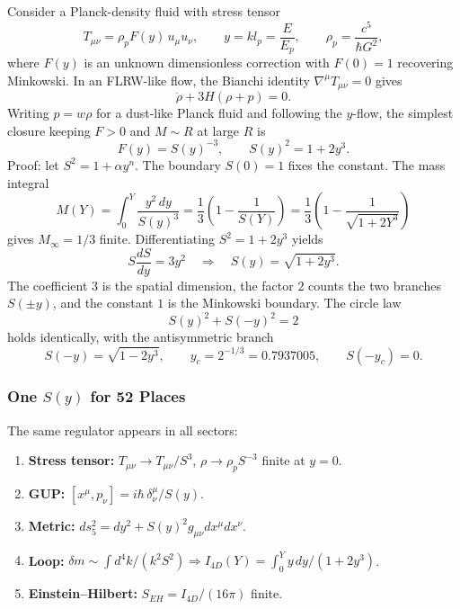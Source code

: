 \documentclass[a4paper,1pt,oneside,openany]{book}
\begin{document}
Consider a Planck-density fluid with stress tensor
\begin{equation}
T_{\mu\nu} = \rho_p F(y)\, u_\mu u_\nu, \qquad y = k l_p = \frac{E}{E_p}, \qquad \rho_p = \frac{c^5}{\hbar G^2},
\label{eq:stress_tensor}
\end{equation}
where \(F(y)\) is an unknown dimensionless correction with \(F(0) = 1\) recovering Minkowski. In an FLRW-like flow, the Bianchi identity \(\nabla^\mu T_{\mu\nu} = 0\) gives
\begin{equation}
\dot\rho + 3H(\rho + p) = 0.
\end{equation}
Writing \(p = w\rho\) for a dust-like Planck fluid and following the \(y\)-flow, the simplest closure keeping \(F > 0\) and \(M \sim R\) at large \(R\) is
\begin{equation}
F(y) = S(y)^{-3}, \qquad S(y)^2 = 1 + 2y^3.
\label{eq:regulator}
\end{equation}
Proof: let \(S^2 = 1 + \alpha y^n\). The boundary \(S(0) = 1\) fixes the constant. The mass integral
\begin{equation}
M(Y) = \int_0^Y \frac{y^2\,dy}{S(y)^3} = \frac{1}{3}\left(1 - \frac{1}{S(Y)}\right) = \frac{1}{3}\left(1 - \frac{1}{\sqrt{1+2Y^3}}\right)
\label{eq:mass_integral}
\end{equation}
gives \(M_\infty = 1/3\) finite. Differentiating \(S^2 = 1 + 2y^3\) yields
\begin{equation}
\boxed{S\frac{dS}{dy} = 3y^2 \quad \Longrightarrow \quad S(y) = \sqrt{1+2y^3}.}
\label{eq:bianchi_solution}
\end{equation}
The coefficient \(3\) is the spatial dimension, the factor \(2\) counts the two branches \(S(\pm y)\), and the constant \(1\) is the Minkowski boundary. The circle law
\begin{equation}
S(y)^2 + S(-y)^2 = 2
\label{eq:circle_law}
\end{equation}
holds identically, with the antisymmetric branch
\begin{equation}
S(-y) = \sqrt{1-2y^3}, \qquad y_c = 2^{-1/3} = 0.7937005, \qquad S(-y_c) = 0.
\end{equation}

\subsubsection{One \(S(y)\) for 52 Places}
\label{sssec:one_S}
The same regulator appears in all sectors:
\begin{enumerate}
\item \textbf{Stress tensor:} \(T_{\mu\nu} \to T_{\mu\nu}/S^3\), \(\rho \to \rho_p S^{-3}\) finite at \(y = 0\).
\item \textbf{GUP:} \([x^\mu, p_\nu] = i\hbar\,\delta^\mu_\nu / S(y)\).
\item \textbf{Metric:} \(ds_5^2 = dy^2 + S(y)^2 g_{\mu\nu}dx^\mu dx^\nu\).
\item \textbf{Loop:} \(\delta m \sim \int d^4k / (k^2 S^2) \Rightarrow I_{4D}(Y) = \int_0^Y y\,dy/(1+2y^3)\).
\item \textbf{Einstein--Hilbert:} \(S_{EH} = I_{4D}/(16\pi)\) finite.
\end{enumerate}
\end{document}
